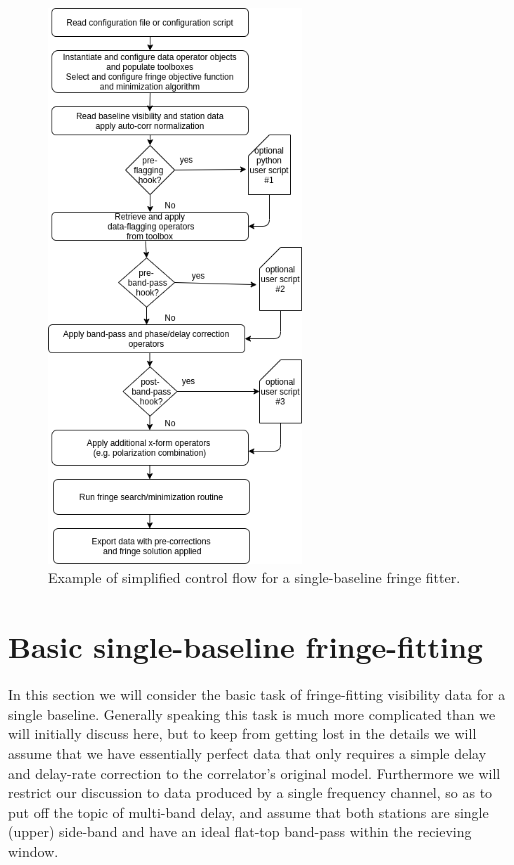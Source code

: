 \begin{figure}[H]
\begin{center}
  \includegraphics[width=0.6\textwidth]{fig/example-single-baseline-fringe-fitter.png}
    \caption{Example of simplified control flow for a single-baseline fringe fitter.}
    \label{fig:fringe-fitter}
\end{center}
\end{figure}




\section{Basic single-baseline fringe-fitting}

In this section we will consider the basic task of fringe-fitting visibility data for a single baseline. Generally speaking this task is much more complicated than we will initially discuss here, but to keep from getting lost in the details we will assume that we have essentially perfect data that only requires a simple delay and delay-rate correction to the correlator's original model. Furthermore we will restrict our discussion to data produced by a single frequency channel, so as to put off the topic of multi-band delay, and assume that both stations are single (upper) side-band and have an ideal flat-top band-pass within the recieving window.

